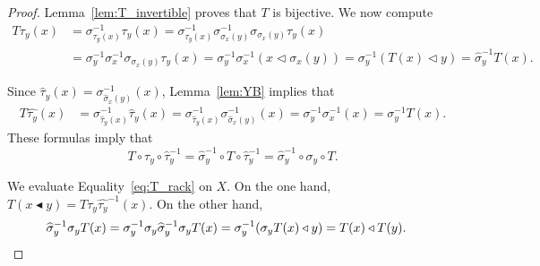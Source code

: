 \begin{proof}
    Lemma~\ref{lem:T_invertible} proves that $T$ is bijective. 
    We now compute 
    \begin{align*}
        T\tau_y(x) &= 
        \sigma^{-1}_{\tau_y(x)}\tau_y(x)
        =\sigma^{-1}_{\tau_y(x)}\sigma^{-1}_{\sigma_x(y)}\sigma_{\sigma_x(y)}\tau_y(x)\\
        &=\sigma^{-1}_y\sigma^{-1}_x\sigma_{\sigma_x(y)}\tau_y(x)
        =\sigma^{-1}_y\sigma_x^{-1}(x\triangleleft\sigma_x(y))
        =\sigma^{-1}_y(T(x)\triangleleft y)
        =\widehat{\sigma}^{-1}_yT(x).
    \end{align*}

    Since $\widehat{\tau}_y(x)=\sigma^{-1}_{\widehat{\sigma}_x(y)}(x)$, Lemma~\ref{lem:YB} implies that 
    \begin{align*}
        T\widehat{\tau_y}(x) 
        &=\sigma^{-1}_{\widehat{\tau}_y(x)}\widehat{\tau}_y(x)
        =\sigma^{-1}_{\widehat{\tau}_y(x)}\sigma^{-1}_{\widehat{\sigma}_x(y)}(x)
        =\sigma^{-1}_{y}\sigma^{-1}_{x}(x)
        =\sigma^{-1}_{y}T(x).
    \end{align*}
    These formulas imply that
    \begin{equation}
        \label{eq:T_rack}
        T\circ\tau_y\circ\widehat{\tau}_y^{-1}
        =\widehat{\sigma}^{-1}_y\circ T\circ \widehat{\tau}^{-1}_y
        =\widehat{\sigma}^{-1}_y\circ \sigma_y\circ T.
    \end{equation}

    We evaluate Equality~\eqref{eq:T_rack} on $X$. On the one hand, 
    $T(x\blacktriangleleft y)=T\tau_y\widehat{\tau_y}^{-1}(x)$.
    On the other hand,
    \begin{align*}
        \widehat{\sigma}_y^{-1}\sigma_yT(x)
        &=\sigma_y^{-1}\sigma_y\widehat{\sigma}_y^{-1}\sigma_yT(x)
        =\sigma_y^{-1}(\sigma_yT(x)\triangleleft y)=T(x)\triangleleft T(y).\qedhere
    \end{align*}
\end{proof}



